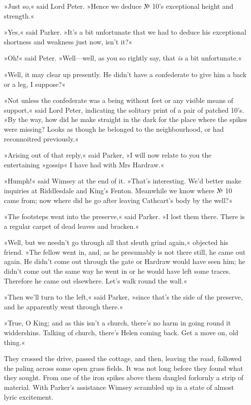 »Just so,« said Lord Peter. »Hence we deduce № 10's exceptional height and strength.«

»Yes,« said Parker. »It's a bit unfortunate that we had to deduce his exceptional shortness and weakness just now, isn't it?«

»Oh!« said Peter. »Well\allowbreak---\allowbreak well, as you so rightly say, that \textit{is} a bit unfortunate.«

»Well, it may clear up presently. He didn't have a confederate to give him a back or a leg, I suppose?«

»Not unless the confederate was a being without feet or any visible means of support,« said Lord Peter, indicating the solitary print of a pair of patched 10's. »By the way, how did he make straight in the dark for the place where the spikes were missing? Looks as though he belonged to the neighbourhood, or had reconnoitred previously.«

»Arising out of that reply,« said Parker, »I will now relate to you the entertaining »gossip« I have had with Mrs Hardraw.«

»Humph!« said Wimsey at the end of it. »That's interesting. We'd better make inquiries at Riddlesdale and King's Fenton. Meanwhile we know where № 10 came from; now where did he go after leaving Cathcart's body by the well?«

»The footsteps went into the preserve,« said Parker. »I lost them there. There is a regular carpet of dead leaves and bracken.«

»Well, but we needn't go through all that sleuth grind again,« objected his friend. »The fellow went in, and, as he presumably is not there still, he came out again. He didn't come out through the gate or Hardraw would have seen him; he didn't come out the same way he went in or he would have left some traces. Therefore he came out elsewhere.  Let's walk round the wall.«

»Then we'll turn to the left,« said Parker, »since that's the side of the preserve, and he apparently went through there.«

»True, O King; and as this isn't a church, there's no harm in going round it widdershins. Talking of church, there's Helen coming back. Get a move on, old thing.«

They crossed the drive, passed the cottage, and then, leaving the road, followed the paling across some open grass fields. It was not long before they found what they sought. From one of the iron spikes above them dangled forlornly a strip of material. With Parker's assistance Wimsey scrambled up in a state of almost lyric excitement.

